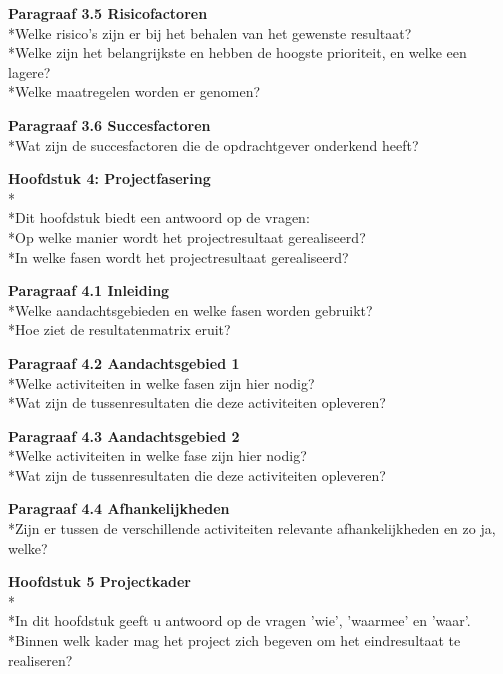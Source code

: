 \documentclass{article}
\begin{document}
\noindent
\textbf{Paragraaf 3.5 Risicofactoren}
\\*Welke risico's zijn er bij het behalen van het gewenste resultaat?
\\*Welke zijn het belangrijkste en hebben de hoogste prioriteit, en welke een lagere?
\\*Welke maatregelen worden er genomen?
\newline

\noindent
\textbf{Paragraaf 3.6 Succesfactoren}
\\*Wat zijn de succesfactoren die de opdrachtgever onderkend heeft?
\newline
\newline

\textbf{Hoofdstuk 4: Projectfasering}
\\*
\\*Dit hoofdstuk biedt een antwoord op de vragen:
\\*Op welke manier wordt het projectresultaat gerealiseerd?
\\*In welke fasen wordt het projectresultaat gerealiseerd?
\newline

\noindent
\textbf{Paragraaf 4.1 Inleiding}
\\*Welke aandachtsgebieden en welke fasen worden gebruikt?
\\*Hoe ziet de resultatenmatrix eruit?
\newline

\noindent
\textbf{Paragraaf 4.2 Aandachtsgebied 1}
\\*Welke activiteiten in welke fasen zijn hier nodig?
\\*Wat zijn de tussenresultaten die deze activiteiten opleveren?
\newline

\noindent
\textbf{Paragraaf 4.3 Aandachtsgebied 2}
\\*Welke activiteiten in welke fase zijn hier nodig?
\\*Wat zijn de tussenresultaten die deze activiteiten opleveren?
\newline

\noindent
\textbf{Paragraaf 4.4 Afhankelijkheden}
\\*Zijn er tussen de verschillende activiteiten relevante afhankelijkheden en zo ja, welke?
\newline
\newline

\textbf{Hoofdstuk 5 Projectkader}
\\*
\\*In dit hoofdstuk geeft u antwoord op de vragen 'wie', 'waarmee' en 'waar'.
\\*Binnen welk kader mag het project zich begeven om het eindresultaat te realiseren?
\newline
\end{document}
